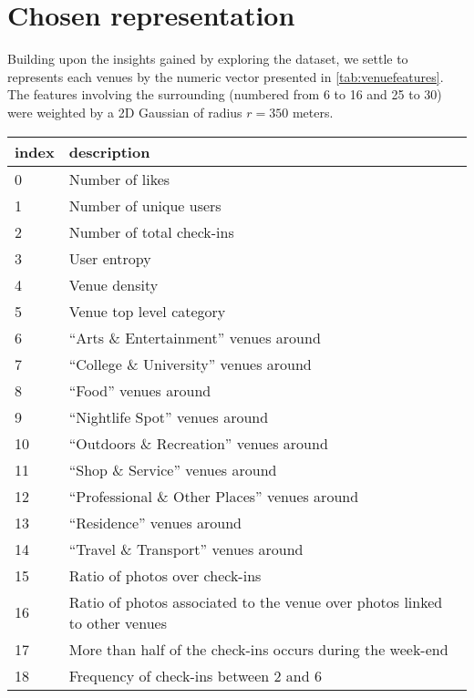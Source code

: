 \section{Chosen representation}
\label{sec:feature}

Building upon the insights gained by exploring the dataset, we settle to
represents  each venues by the numeric vector presented in
\autoref{tab:venuefeatures}.  The features involving the surrounding (numbered
from 6 to 16 and 25 to 30) were weighted by a 2D Gaussian of radius $r=350$
meters.

\begin{table}[hb]
    \centering
    \begin{tabularx}{\textwidth}{lX}
        \toprule
        index & description \\
        \midrule
	\datasetRow{}0 & Number of likes \\
	\datasetRow{}1 & Number of unique users \\
	\datasetRow{}2 & Number of total check-ins \\
        3 & User entropy \\
        4 & Venue density \\
	\datasetRow{}5 & Venue top level category \\
        6 & \enquote{Arts \& Entertainment} venues around \\
        7 & \enquote{College \& University} venues around \\
        8 & \enquote{Food} venues around \\
        9 & \enquote{Nightlife Spot} venues around \\
        10 & \enquote{Outdoors \& Recreation} venues around \\
        11 & \enquote{Shop \& Service} venues around \\
        12 & \enquote{Professional \& Other Places} venues around \\
        13 & \enquote{Residence} venues around \\
        14 & \enquote{Travel \& Transport} venues around \\
	15 & Ratio of photos over check-ins \\
	16 & Ratio of photos associated to the venue over photos linked to other venues \\
	17 & More than half of the check-ins occurs during the week-end \\
	18 & Frequency of check-ins between 2 \am{} and 6 \am{} \\

\end{tabularx}
\end{table}
